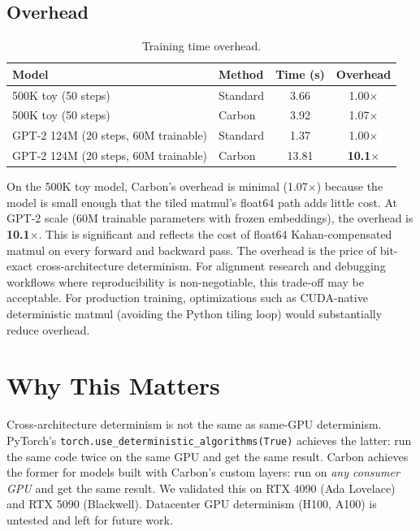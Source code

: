 \documentclass[11pt,a4paper]{article}
\begin{document}
\subsection{Overhead}

\begin{table}[h]
\centering
\caption{Training time overhead.}
\begin{tabular}{llcc}
\toprule
Model & Method & Time (s) & Overhead \\
\midrule
500K toy (50 steps) & Standard & 3.66 & 1.00$\times$ \\
500K toy (50 steps) & Carbon & 3.92 & 1.07$\times$ \\
\midrule
GPT-2 124M (20 steps, 60M trainable) & Standard & 1.37 & 1.00$\times$ \\
GPT-2 124M (20 steps, 60M trainable) & Carbon & 13.81 & \textbf{10.1$\times$} \\
\bottomrule
\end{tabular}
\end{table}

On the 500K toy model, Carbon's overhead is minimal (1.07$\times$) because
the model is small enough that the tiled matmul's float64 path adds little
cost. At GPT-2 scale (60M trainable parameters with frozen embeddings),
the overhead is \textbf{10.1$\times$}. This is significant and reflects
the cost of float64 Kahan-compensated matmul on every forward and backward
pass. The overhead is the price of bit-exact cross-architecture determinism.
For alignment research and debugging workflows where reproducibility is
non-negotiable, this trade-off may be acceptable. For production training,
optimizations such as CUDA-native deterministic matmul (avoiding the Python
tiling loop) would substantially reduce overhead.

\section{Why This Matters}

Cross-architecture determinism is not the same as same-GPU determinism.
PyTorch's \texttt{torch.use\_deterministic\_algorithms(True)} achieves the
latter: run the same code twice on the same GPU and get the same result.
Carbon achieves the former for models built with Carbon's custom layers: run
on \emph{any consumer GPU} and get the same result. We validated this on
RTX 4090 (Ada Lovelace) and RTX 5090 (Blackwell). Datacenter GPU
determinism (H100, A100) is untested and left for future work.
\end{document}
